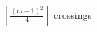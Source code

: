 \documentclass[preview]{standalone}
\begin{document}
\begin{center}
$\left\lceil\frac{(m-1)^2}{4}\right\rceil$ crossings
\end{center}
\end{document}
